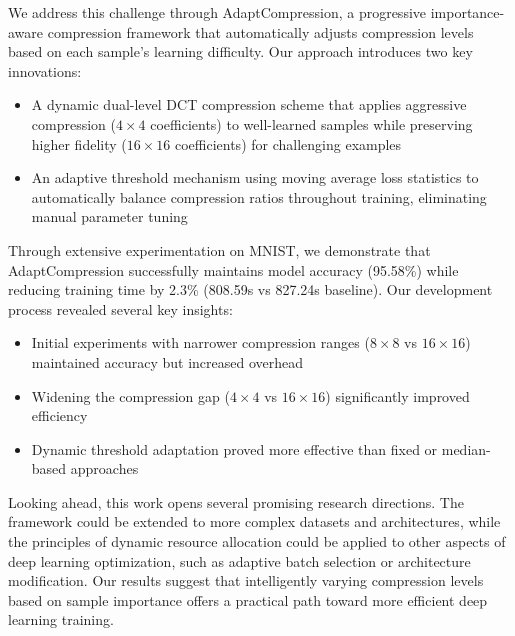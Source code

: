 \documentclass{article} %
\begin{document}
We address this challenge through AdaptCompression, a progressive importance-aware compression framework that automatically adjusts compression levels based on each sample's learning difficulty. Our approach introduces two key innovations:

\begin{itemize}
    \item A dynamic dual-level DCT compression scheme that applies aggressive compression ($4 \times 4$ coefficients) to well-learned samples while preserving higher fidelity ($16 \times 16$ coefficients) for challenging examples
    \item An adaptive threshold mechanism using moving average loss statistics to automatically balance compression ratios throughout training, eliminating manual parameter tuning
\end{itemize}

Through extensive experimentation on MNIST, we demonstrate that AdaptCompression successfully maintains model accuracy (95.58\%) while reducing training time by 2.3\% (808.59s vs 827.24s baseline). Our development process revealed several key insights:

\begin{itemize}
    \item Initial experiments with narrower compression ranges ($8 \times 8$ vs $16 \times 16$) maintained accuracy but increased overhead
    \item Widening the compression gap ($4 \times 4$ vs $16 \times 16$) significantly improved efficiency
    \item Dynamic threshold adaptation proved more effective than fixed or median-based approaches
\end{itemize}

Looking ahead, this work opens several promising research directions. The framework could be extended to more complex datasets and architectures, while the principles of dynamic resource allocation could be applied to other aspects of deep learning optimization, such as adaptive batch selection or architecture modification. Our results suggest that intelligently varying compression levels based on sample importance offers a practical path toward more efficient deep learning training.
\end{document}
